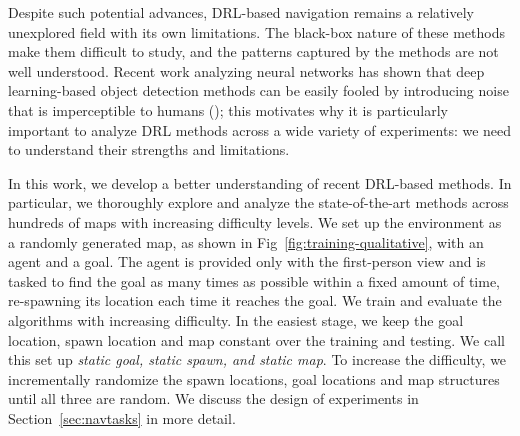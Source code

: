 Despite such potential advances, DRL-based navigation remains a relatively unexplored field with its own limitations. 
The black-box nature of these methods make them difficult to study, and the patterns captured by the methods are not well understood. 
Recent work analyzing neural networks has shown that deep learning-based object detection methods can be easily fooled by introducing noise that is imperceptible to humans (\cite{NgYoClCVPR2015}); this motivates why it is particularly important to analyze DRL methods across a wide variety of experiments: we need to understand their strengths and limitations.


In this work, we develop a better understanding of recent DRL-based methods. In particular, we thoroughly explore and analyze the state-of-the-art \cite{MiPaViICLR2017} methods across hundreds of maps with increasing difficulty levels. 
We set up the environment as a randomly generated map, as shown in Fig~\ref{fig:training-qualitative}, with an agent and a goal.
The agent is provided only with the first-person view and is tasked to find the goal as many times as possible within a fixed amount of time, re-spawning its location each time it reaches the goal. 
We train and evaluate the algorithms with increasing difficulty.
In the easiest stage, we keep the goal location, spawn location and map constant over the training and testing.
We call this set up \emph{static goal, static spawn, and static map}.
To increase the difficulty, we incrementally randomize the spawn locations, goal locations and map structures until all three are random.
We discuss the design of experiments in Section~\ref{sec:navtasks} in more detail.

